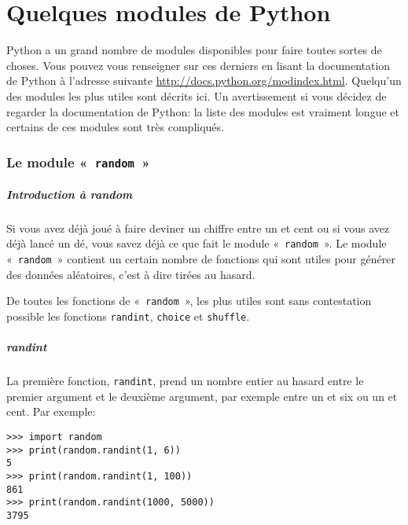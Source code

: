 

\chapter{Quelques modules de Python}\label{app:modules}

Python a un grand nombre de modules disponibles pour faire toutes sortes de choses. Vous pouvez vous renseigner sur ces derniers en lisant la documentation de Python à l'adresse suivante \url{http://docs.python.org/modindex.html}. Quelqu'un des modules les plus utiles sont décrits ici. Un avertissement si vous décidez de regarder la documentation de Python: la liste des modules est vraiment longue et certains de ces modules sont très compliqués.

\subsection{Le module «~\texttt{random}~»}
\paragraph{Introduction à random}
Si vous avez déjà joué à faire deviner un chiffre entre un et cent ou si vous avez déjà lancé un dé, vous savez déjà ce que fait le module «~\texttt{random}~». Le module «~\texttt{random}~» contient un certain nombre de fonctions qui sont utiles pour générer des données aléatoires, c'est à dire tirées au hasard.

De toutes les fonctions de «~\texttt{random}~», les plus utiles sont sans contestation possible les fonctions \verb+randint+, \verb+choice+ et \verb+shuffle+. 

\paragraph{randint}
La première fonction, \verb+randint+, prend un nombre entier au hasard entre le premier argument et le deuxième argument, par exemple entre un et six ou un et cent. Par exemple:

\begin{Verbatim}[frame=single,rulecolor=\color{gray}]
>>> import random
>>> print(random.randint(1, 6))
5
>>> print(random.randint(1, 100))
861
>>> print(random.randint(1000, 5000))
3795
\end{Verbatim}

